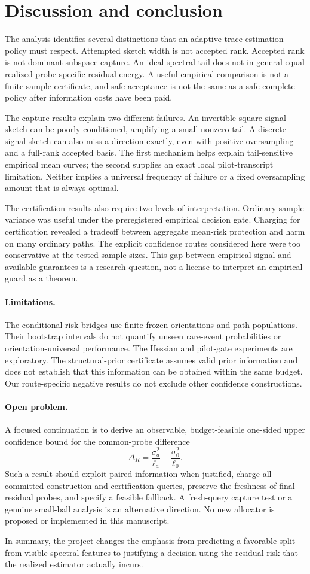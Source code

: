 \section{Discussion and conclusion}\label{sec:discussion}
The analysis identifies several distinctions that an adaptive
trace-estimation policy must respect. Attempted sketch width is not accepted
rank. Accepted rank is not dominant-subspace capture. An ideal spectral tail
does not in general equal realized probe-specific residual energy. A useful
empirical comparison is not a finite-sample certificate, and safe acceptance
is not the same as a safe complete policy after information costs have been
paid.

The capture results explain two different failures. An invertible square
signal sketch can be poorly conditioned, amplifying a small nonzero tail.
A discrete signal sketch can also miss a direction exactly, even with
positive oversampling and a full-rank accepted basis. The first mechanism
helps explain tail-sensitive empirical mean curves; the second supplies an
exact local pilot-transcript limitation. Neither implies a universal
frequency of failure or a fixed oversampling amount that is always optimal.

The certification results also require two levels of interpretation.
Ordinary sample variance was useful under the preregistered empirical
decision gate. Charging for certification revealed a tradeoff between
aggregate mean-risk protection and harm on many ordinary paths. The explicit
confidence routes considered here were too conservative at the tested
sample sizes. This gap between empirical signal and available guarantees
is a research question, not a license to interpret an empirical guard as
a theorem.

\paragraph{Limitations.}
The conditional-risk bridges use finite frozen orientations and path
populations. Their bootstrap intervals do not quantify unseen rare-event
probabilities or orientation-universal performance. The Hessian and
pilot-gate experiments are exploratory. The structural-prior certificate
assumes valid prior information and does not establish that this information
can be obtained within the same budget. Our route-specific negative results
do not exclude other confidence constructions.

\paragraph{Open problem.}
A focused continuation is to derive an observable, budget-feasible
one-sided upper confidence bound for the common-probe difference
\[
\Delta_R=\frac{\sigma_a^2}{\ell_a}-\frac{\sigma_0^2}{\ell_0}.
\]
Such a result should exploit paired information when justified, charge all
committed construction and certification queries, preserve the freshness of
final residual probes, and specify a feasible fallback. A fresh-query
capture test or a genuine small-ball analysis is an alternative direction.
No new allocator is proposed or implemented in this manuscript.

In summary, the project changes the emphasis from predicting a favorable
split from visible spectral features to justifying a decision using the
residual risk that the realized estimator actually incurs.
